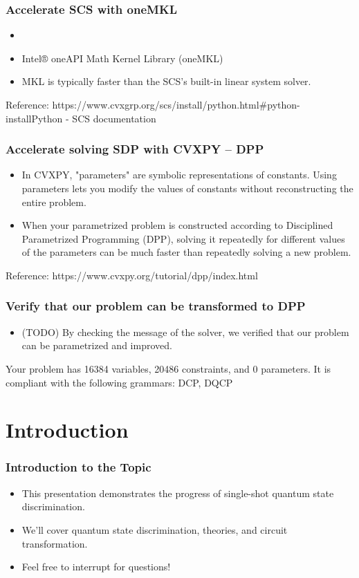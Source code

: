 \documentclass{beamer}
\begin{document}
\begin{frame}
  \frametitle{Accelerate SCS with oneMKL}
  \begin{itemize}
    \item
    \item Intel® oneAPI Math Kernel Library (oneMKL)
    \item MKL is typically faster than the SCS's built-in linear system solver.
  \end{itemize}
  \tiny{Reference: https://www.cvxgrp.org/scs/install/python.html\#python-install}{Python - SCS documentation}
\end{frame}

\begin{frame}
  \frametitle{Accelerate solving SDP with CVXPY -- DPP}
  \begin{itemize}
    \item In CVXPY, "parameters" are symbolic representations of constants.
          Using parameters lets you modify the values of constants
          without reconstructing the entire problem.
    \item When your parametrized problem is constructed according to
          Disciplined Parametrized Programming (DPP), solving it repeatedly
          for different values of the parameters can be much faster than
          repeatedly solving a new problem.
  \end{itemize}
  \tiny{Reference: https://www.cvxpy.org/tutorial/dpp/index.html}
\end{frame}

\begin{frame}
  \frametitle{Verify that our problem can be transformed to DPP}
  \begin{itemize}
    \item (TODO) By checking the message of the solver, we verified that our problem
          can be parametrized and improved.
  \end{itemize}
  Your problem has 16384 variables, 20486 constraints, and 0 parameters.
  It is compliant with the following grammars: DCP, DQCP
\end{frame}


\section{Introduction}
\begin{frame}
  \frametitle{Introduction to the Topic}
  \begin{itemize}
    \item<1-> This presentation demonstrates the progress of single-shot quantum state discrimination.
    \item<2-> We'll cover quantum state discrimination, theories, and circuit transformation.
    \item<3-> Feel free to interrupt for questions!
  \end{itemize}
\end{frame}
\end{document}
